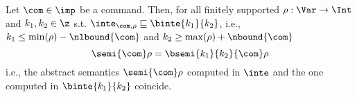 
\begin{theorem}\label{th:bounded}
  Let \(\com\in \imp\) be a command. Then, for all finitely supported
  \(\rho : \Var \to \Int\) and \(k_1, k_2\in \z\) s.t.
  \(\inte_{\com,\rho} \sqsubseteq \binte{k_1}{k_2}\), i.e.,
  \(k_1 \leq \min(\rho) - \nlbound{\com}\) and
  \(k_2 \geq \max(\rho) + \nbound{\com}\)
  \begin{equation}\label{eq:equal}
    \semi{\com}\rho = \bsemi{k_1}{k_2}{\com}\rho
  \end{equation}
  i.e., the abstract semantics \(\semi{\com} \rho\)
  computed in \(\inte\) and the one computed in \(\binte{k_1}{k_2}\)
  coincide.
\end{theorem}

